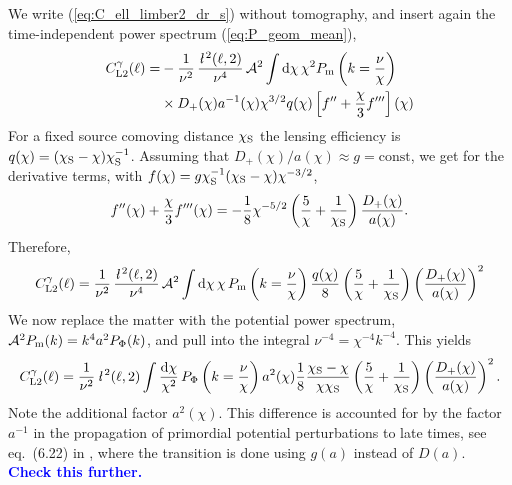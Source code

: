 \documentclass[fleqn,usenatbib]{mnras} %
\newcommand{\ellbar}{\hbox{\it \l}\,}
\newcommand{\pref}{{\cal A}}
\newcommand{\mk}[1]{{\bf\textcolor{blue}{#1}}}
\begin{document}
\begin{appendix}
We write (\ref{eq:C_ell_limber2_dr_s}) without tomography, and insert again the
time-independent power spectrum (\ref{eq:P_geom_mean}),
%
\begin{align}
  C^\gamma_{{\rm L2}}(\ell) = & - \frac 1 {\nu^2} \, \frac{\ellbar^2(\ell, 2)}{\nu^4} \, \pref^2
    \int {\rm d} \chi \, \chi^{2} P_{\rm m}\left(k = \frac\nu\chi\right)
    \nonumber \\
    & \times D_+(\chi) a^{-1}(\chi) \chi^{3/2} q(\chi) \left[ f^{\prime\prime} 
      + \frac{\chi}{3} f^{\prime\prime\prime} 
    \right](\chi)
  \label{eq:C_ell_limber2_dr_notomo}
\end{align}
%
For a fixed source comoving distance $\chi_{\rm S}$ the lensing efficiency is
$q(\chi) = (\chi_{\rm S} - \chi) \chi_{\rm S}^{-1}$. Assuming that
$D_+(\chi)/a(\chi) \approx g = \mbox{const}$, we get for the derivative terms,
with $f(\chi) = g \chi_{\rm S}^{-1} (\chi_{\rm S} - \chi) \chi^{-3/2}$,
%
\begin{equation}
  f^{\prime\prime}(\chi) + \frac{\chi}{3} f^{\prime\prime\prime}(\chi)
    = - \frac 1 8 \chi^{-5/2} \left( \frac 5 \chi
          + \frac 1 {\chi_{\rm S}} \right) \frac{D_+(\chi)}{a(\chi)}.
\end{equation}
%
Therefore,
%
\begin{align}
  C^\gamma_{{\rm L2}}(\ell) = \frac 1 {\nu^2} \, \frac{\ellbar^2(\ell, 2)}{\nu^4} \, \pref^2
    \int {\rm d} \chi \, \chi \, P_{\rm m}\left(k = \frac\nu\chi\right)
    \frac{q(\chi)}{8} \left( \frac 5 \chi + \frac 1 {\chi_{\rm S}} \right)
      \left(\frac{D_+(\chi)}{a(\chi)}\right)^2 
\end{align}
%
We now replace the matter with the potential power spectrum, ${\cal A}^2 P_{\rm m}(k) = k^{4} a^2 P_\Phi(k)$, and pull into the integral $\nu^{-4} = \chi^{-4} k^{-4}$. This yields
%
\begin{align}
  C^\gamma_{{\rm L2}}(\ell) = \frac 1 {\nu^2} \, \ellbar^2(\ell, 2)
    \int \frac{{\rm d} \chi}{\chi^2} \, P_\Phi\left(k = \frac\nu\chi\right)
    a^2(\chi) \frac{1}{8} \frac{\chi_{\rm S} - \chi}{\chi \chi_{\rm S}}
    \left( \frac 5 \chi + \frac 1 {\chi_{\rm S}} \right)
      \left(\frac{D_+(\chi)}{a(\chi)}\right)^2 .
\end{align}
%
Note the additional factor $a^2(\chi)$. This difference is accounted for by the
factor $a^{-1}$ in the propagation of primordial potential perturbations to
late times, see eq.~(6.22) in \cite{vande2012}, where the transition is done
using $g(a)$ instead of $D(a)$. \mk{Check this further.}



\end{appendix}
\end{document}
